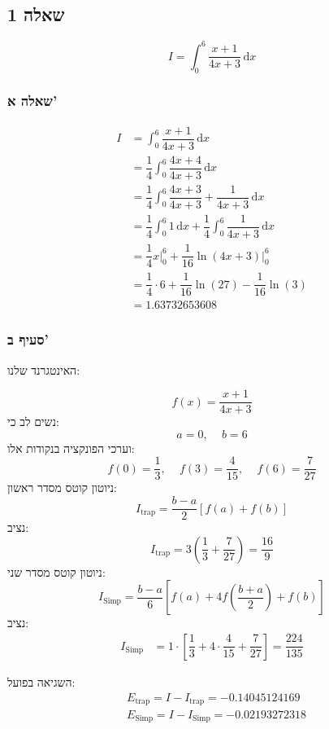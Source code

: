 \documentclass[
  a4paper,
]{article}
\begin{document}
\subsection{שאלה 1}\label{ux5e9ux5d0ux5dcux5d4-1}

\[I=\int_{0}^{6} \dfrac{x+1}{4x+3} \, \mathrm{d}x \]

\subsubsection{שאלה א'}\label{ux5e9ux5d0ux5dcux5d4-ux5d0}

\[\begin{aligned}
I&=\int_{0}^{6} \dfrac{x+1}{4x+3} \, \mathrm{d}x  \\[2ex]
&=\dfrac{1}{4}\int_{0}^{6} \dfrac{4x+4}{4x+3} \, \mathrm{d}x  \\[2ex]
&=\dfrac{1}{4}\int_{0}^{6} \dfrac{4x+3}{4x+3}+\dfrac{1}{4x+3} \, \mathrm{d}x \\[2ex]
  & =\dfrac{1}{4}\int_{0}^{6} 1 \, \mathrm{d}x +\dfrac{1}{4}\int_{0}^{6} \dfrac{1}{4x+3} \, \mathrm{d}x  \\[2ex]
&=\dfrac{1}{4}x\bigg|_{0}^{6} +\dfrac{1}{16}\ln(4x+3)\bigg|_{0}^{6} \\[2ex]
&=\dfrac{1}{4}\cdot 6+\dfrac{1}{16}\ln(27)-\dfrac{1}{16}\ln(3) \\[2ex]
&=\boxed {
1.63732653608
 }
\end{aligned}\]

\subsubsection{סעיף ב'}\label{ux5e1ux5e2ux5d9ux5e3-ux5d1}

האינטגרנד שלנו:

\[f(x)=\dfrac{x+1}{4x+3}\] נשים לב כי: \[a=0,\, \quad b=6\] וערכי
הפונקציה בנקודות אלו:
\[f(0)=\dfrac{1}{3},\, \quad f(3)=\dfrac{4}{15},\, \quad f(6)=\dfrac{7}{27}\]
ניוטון קוטס מסדר ראשון: \[I_{\text{trap}}=\dfrac{b-a}{2}[f(a)+f(b)]\]
נציב:
\[I_{\text{trap}}=3\left( \dfrac{1}{3}+\dfrac{7}{27} \right)=\boxed {
\dfrac{16}{9}
 }\] ניוטון קוטס מסדר שני:
\[I_{\text{Simp}}=\dfrac{b-a}{6}\left[ f(a)+4f\left( \dfrac{b+a}{2} \right)+f(b) \right]\]
נציב: \[\begin{aligned}
I_{\text{Simp}} & =1\cdot\left[ \dfrac{1}{3}+4\cdot \dfrac{4}{15}+\dfrac{7}{27} \right]=\boxed {
\dfrac{224}{135}
 }
\end{aligned}\]

השגיאה בפועל: \[\begin{aligned}
 & E_{\text{trap}}=I-I_{\text{trap}}=\boxed {
-0.14045124169
 } \\[2ex]
 & E_{\text{Simp}}=I-I_{\text{Simp}}=\boxed{ -0.02193272318}
\end{aligned}\]
\end{document}
